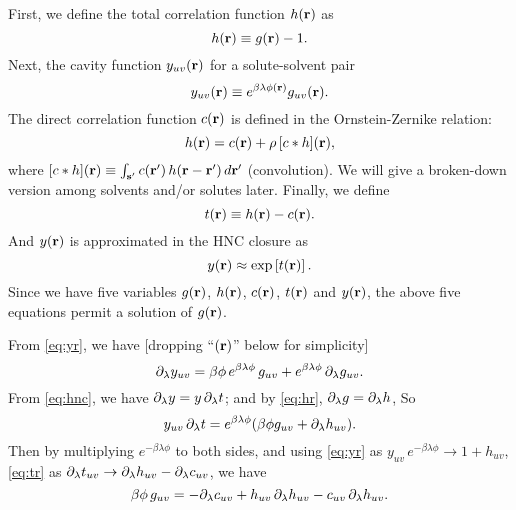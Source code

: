 \documentclass[10pt]{article}
\begin{document}
First,
we define the total correlation function $h(\mathbf{r})$ as
\begin{equation}
  h(\mathbf{r}) \equiv g(\mathbf{r}) - 1.
  \label{eq:hr}
\end{equation}
%
%
%
Next, the cavity function $y_{uv}(\mathbf{r})$ for a solute-solvent pair
\begin{equation}
  y_{uv}(\mathbf{r}) \equiv e^{ \beta \lambda \phi(\mathbf{r}) } g_{uv}(\mathbf{r}).
  \label{eq:yr}
\end{equation}
%
%
%
The direct correlation function $c(\mathbf{r})$
is defined in the Ornstein-Zernike relation:
\begin{equation}
  h(\mathbf{r}) = c(\mathbf{r}) + \rho \, [c * h](\mathbf{r}),
  \label{eq:cr}
\end{equation}
where $[c*h](\mathbf{r}) \equiv \int_{\mathbf{s}'} c(\mathbf{r}') \, h(\mathbf{r} - \mathbf{r}') \, d\mathbf{r}'$
  (convolution).
We will give a broken-down version among solvents and/or solutes later.
%
%
%
Finally, we define
\begin{equation}
  t(\mathbf{r}) \equiv h(\mathbf{r}) - c(\mathbf{r}).
  \label{eq:tr}
\end{equation}
%
%
%
And $y(\mathbf{r})$ is approximated in the HNC closure as
\begin{equation}
  y(\mathbf{r}) \approx \exp\left[ t(\mathbf{r}) \right].
  \label{eq:hnc}
\end{equation}
Since we have five variables
  $g(\mathbf{r})$, $h(\mathbf{r})$, $c(\mathbf{r})$, $t(\mathbf{r})$ and $y(\mathbf{r})$,
the above five equations permit a solution of $g(\mathbf{r})$.



From \eqref{eq:yr}, we have [dropping ``$(\mathbf{r})$'' below for simplicity]
\[
  \partial_\lambda y_{uv}
  =
  \beta \phi \, e^{ \beta \lambda \phi } \, g_{uv}
    +
    e^{ \beta \lambda \phi } \, \partial_\lambda g_{uv}.
\]
From \eqref{eq:hnc}, we have $\partial_\lambda y = y \, \partial_\lambda t$;
and by \eqref{eq:hr}, $\partial_\lambda g = \partial_\lambda h$, So
\[
  y_{uv} \, \partial_\lambda t = e^{\beta \lambda \phi }
  ( \beta \phi g_{uv} + \partial_\lambda h_{uv} ).
\]
Then by multiplying $e^{-\beta \lambda \phi}$ to both sides,
and using
\eqref{eq:yr}
as $y_{uv} \, e^{-\beta \lambda \phi} \rightarrow 1 + h_{uv}$,
\eqref{eq:tr}
as $\partial_\lambda t_{uv} \rightarrow \partial_\lambda h_{uv} - \partial_\lambda c_{uv}$,
we have
\begin{equation}
  \beta \phi \, g_{uv}
  =
  - \partial_\lambda c_{uv} + h_{uv} \, \partial_\lambda h_{uv} - c_{uv} \, \partial_\lambda h_{uv}.
  \label{eq:hc1}
\end{equation}
\end{document}
